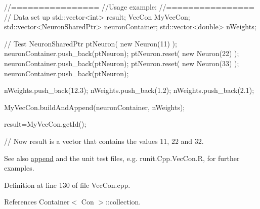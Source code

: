 \begin{DoxyCode}
        //================
        //Usage example:
        //================
        // Data set up
                std::vector<int> result;
                VecCon MyVecCon;
                std::vector<NeuronSharedPtr> neuronContainer;
                std::vector<double> nWeights;


        // Test
                NeuronSharedPtr ptNeuron( new Neuron(11) );
                neuronContainer.push_back(ptNeuron);
                ptNeuron.reset( new Neuron(22) );
                neuronContainer.push_back(ptNeuron);
                ptNeuron.reset( new Neuron(33) );
                neuronContainer.push_back(ptNeuron);

                nWeights.push_back(12.3);
                nWeights.push_back(1.2);
                nWeights.push_back(2.1);

                MyVecCon.buildAndAppend(neuronContainer, nWeights);

                result=MyVecCon.getId();

        // Now result is a vector that contains the values 11, 22 and 32.
\end{DoxyCode}


\begin{DoxySeeAlso}{See also}
\hyperlink{classvec_a_m_o_r_e_ab060ffa67e85997fc4236bedfd2f17b6}{append} and the unit test files, e.g. runit.Cpp.VecCon.R, for further examples. 
\end{DoxySeeAlso}


Definition at line 130 of file VecCon.cpp.



References Container$<$ Con $>$::collection.


